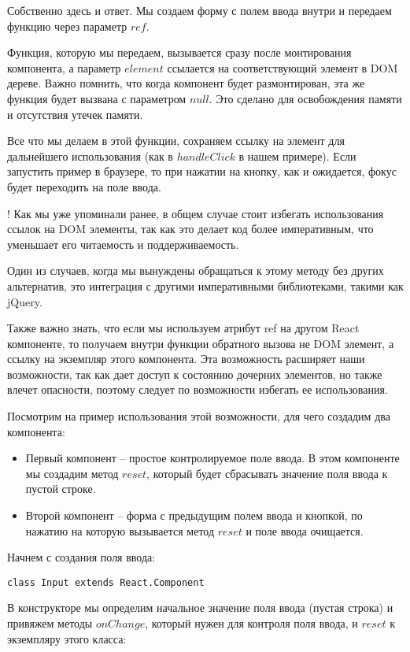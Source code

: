 Собственно здесь и ответ. Мы создаем форму с полем ввода внутри и передаем функцию через параметр $ref$.

Функция, которую мы передаем, вызывается сразу после монтирования компонента, а параметр $element$ ссылается на соответствующий элемент в DOM дереве. Важно помнить, что когда компонент будет размонтирован, эта же функция будет вызвана с параметром $null$. Это сделано для освобождения памяти и отсутствия утечек памяти. 

Все что мы делаем в этой функции, сохраняем ссылку на элемент для дальнейшего использования (как в $handleClick$ в нашем примере). Если запустить пример в браузере, то при нажатии на кнопку, как и ожидается, фокус будет переходить на поле ввода.

! Как мы уже упоминали ранее, в общем случае стоит избегать использования ссылок на DOM элементы, так как это делает код более императивным, что уменьшает его читаемость и поддерживаемость.

Один из случаев, когда мы вынуждены обращаться к этому методу без других альтернатив, это интеграция с другими императивными библиотеками, такими как jQuery.

Также важно знать, что если мы используем атрибут ref на другом React компоненте, то получаем внутри функции обратного вызова не DOM элемент, а ссылку на экземпляр этого компонента. Эта возможность расширяет наши возможности, так как дает доступ к состоянию дочерних элементов, но также влечет опасности, поэтому следует по возможности избегать ее использования.

Посмотрим на пример использования этой возможности, для чего создадим два компонента:

\begin{itemize}
	\item Первый компонент -- простое контролируемое поле ввода. В этом компоненте мы создадим метод $reset$, который будет сбрасывать значение поля ввода к пустой строке.
	\item Второй компонент -- форма с предыдущим полем ввода и кнопкой, по нажатию на которую вызывается метод $reset$ и поле ввода очищается.
\end{itemize}

Начнем с создания поля ввода:

\begin{lstlisting}
class Input extends React.Component
\end{lstlisting}

В конструкторе мы определим начальное значение поля ввода (пустая строка) и привяжем методы $onChange$, который нужен для контроля поля ввода, и $reset$ к экземпляру этого класса:

